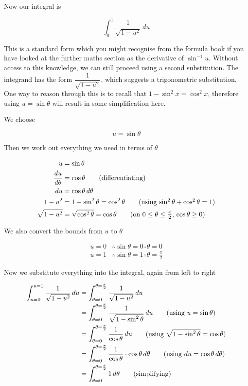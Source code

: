 \begin{solution}
    Now our integral is

    \[
        \int_{0}^{1} \frac{1}{\sqrt{1 - u^2}} \, du
    \]

    This is a standard form which you might recognise from the formula book if you have looked at the further maths section as the derivative of $\sin^{-1} u$. 
    Without access to this knowledge, we can still proceed using a second substitution. The integrand has the form $\dfrac{1}{\sqrt{1 - u^2}}$, which suggests a trigonometric substitution. 
    One way to reason through this is to recall that $1 - \sin^2 x = \cos^2 x$, therefore using $u = \sin \theta$ will result in some simplification here.

    We choose

    \[
        u = \sin \theta
    \]

    Then we work out everything we need in terms of $\theta$

    \begin{align*}
        u &= \sin \theta \\
        \frac{du}{d\theta} &= \cos \theta \tag{differentiating} \\
        du &= \cos \theta \, d\theta \\
        1 - u^2 &= 1 - \sin^2 \theta = \cos^2 \theta \tag{using $\sin^2 \theta + \cos^2 \theta = 1$} \\
        \sqrt{1 - u^2} &= \sqrt{\cos^2 \theta} = \cos \theta \tag{on $0 \leq \theta \leq \frac{\pi}{2}$, $\cos \theta \geq 0$}
    \end{align*}

    We also convert the bounds from $u$ to $\theta$

    \begin{align*}
        u = 0 &\therefore \sin \theta = 0 \therefore \theta = 0 \\
        u = 1 &\therefore \sin \theta = 1 \therefore \theta = \frac{\pi}{2}
    \end{align*}

    Now we substitute everything into the integral, again from left to right

    \begin{align*}
        \int_{u=0}^{u=1} \frac{1}{\sqrt{1 - u^2}} \, du
        &= \int_{\theta=0}^{\theta=\frac{\pi}{2}} \frac{1}{\sqrt{1 - u^2}} \, du \\
        &= \int_{\theta=0}^{\theta=\frac{\pi}{2}} \frac{1}{\sqrt{1 - \sin^2 \theta}} \, du \tag{using $u = \sin \theta$} \\
        &= \int_{\theta=0}^{\theta=\frac{\pi}{2}} \frac{1}{\cos \theta} \, du \tag{using $\sqrt{1 - \sin^2 \theta} = \cos \theta$} \\
        &= \int_{\theta=0}^{\theta=\frac{\pi}{2}} \frac{1}{\cos \theta} \cdot \cos \theta \, d\theta \tag{using $du = \cos \theta \, d\theta$} \\
        &= \int_{\theta=0}^{\theta=\frac{\pi}{2}} 1 \, d\theta \tag{simplifying}
    \end{align*}


\end{solution}
